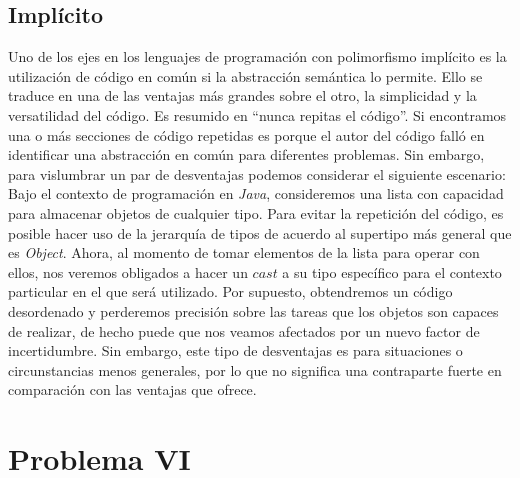 \documentclass[12pt]{article}
\begin{document}
\subsection*{Implícito}
Uno de los ejes en los lenguajes de programación con polimorfismo implícito es la utilización de código en común si la abstracción semántica
lo permite. Ello se traduce en una de las ventajas más grandes sobre el otro, la simplicidad y la versatilidad del código. Es resumido en ``nunca repitas el código''. Si encontramos una o más secciones de código repetidas es porque el autor del código falló en identificar una abstracción en común para diferentes problemas. Sin embargo, para vislumbrar un par de desventajas podemos considerar el siguiente escenario:
Bajo el contexto de programación en \textit{Java}, consideremos una lista con capacidad para almacenar objetos de cualquier tipo. Para evitar la
repetición del código, es posible hacer uso de la jerarquía de tipos de acuerdo al supertipo más general que es \textit{Object}. Ahora, al momento de tomar elementos de la lista para operar con ellos, nos veremos obligados a hacer un $cast$ a su tipo específico para el contexto particular en el que será utilizado. Por supuesto, obtendremos un código desordenado y perderemos precisión sobre las tareas que los objetos son capaces de realizar, de hecho puede que nos veamos afectados por un nuevo factor de incertidumbre.
Sin embargo, este tipo de desventajas es para situaciones o circunstancias menos generales, por lo que no significa una contraparte fuerte en
comparación con las ventajas que ofrece.

\section*{Problema VI}
    
\end{document}

